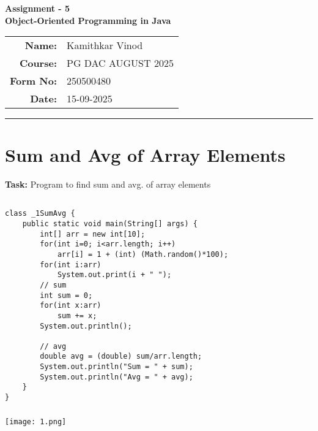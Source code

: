 \documentclass[12pt,a4paper]{article}
\begin{document}
\begin{center}
    \LARGE \textbf{Assignment - 5} \\[0.5cm]
    \Large \textbf{Object-Oriented Programming in Java} \\[1cm]

    \begin{tabular}{rl}
        \textbf{Name:} & Kamithkar Vinod \\
        \textbf{Course:} & PG DAC AUGUST 2025 \\
        \textbf{Form No:} & 250500480 \\
        \textbf{Date:} & 15-09-2025 \\
    \end{tabular}
\end{center}

\vspace{1cm}
\hrule
\vspace{0.5cm}

\section{Sum and Avg of Array Elements}
\textbf{Task:} Program to find sum and avg. of array elements

\subsection{}
\begin{lstlisting}
class _1SumAvg {
    public static void main(String[] args) {
        int[] arr = new int[10];
        for(int i=0; i<arr.length; i++)
            arr[i] = 1 + (int) (Math.random()*100);
        for(int i:arr)
            System.out.print(i + " ");
        // sum
        int sum = 0;
        for(int x:arr)
            sum += x;
        System.out.println();
    
        // avg
        double avg = (double) sum/arr.length;
        System.out.println("Sum = " + sum);
        System.out.println("Avg = " + avg);
    }
}
\end{lstlisting}

\subsubsection{}
\begin{center}
    \texttt{[image: 1.png]}
\end{center}

\end{document}
